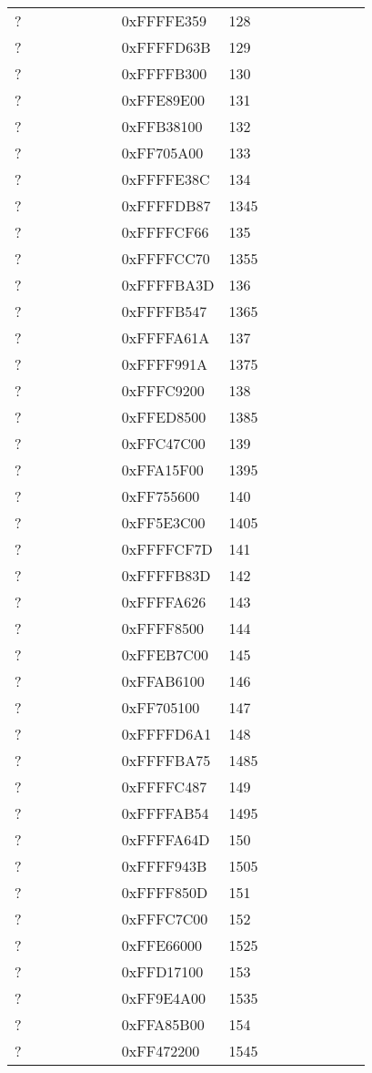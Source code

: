 \begin{longtable}{p{0.3\linewidth} p{0.3\linewidth} p{0.4\linewidth}}
? &  0xFFFFE359 &  128\\
? &  0xFFFFD63B &  129\\
? &  0xFFFFB300 &  130\\
? &  0xFFE89E00 &  131\\
? &  0xFFB38100 &  132\\
? &  0xFF705A00 &  133\\
? &  0xFFFFE38C &  134\\
? &  0xFFFFDB87 &  1345\\
? &  0xFFFFCF66 &  135\\
? &  0xFFFFCC70 &  1355\\
? &  0xFFFFBA3D &  136\\
? &  0xFFFFB547 &  1365\\
? &  0xFFFFA61A &  137\\
? &  0xFFFF991A &  1375\\
? &  0xFFFC9200 &  138\\
? &  0xFFED8500 &  1385\\
? &  0xFFC47C00 &  139\\
? &  0xFFA15F00 &  1395\\
? &  0xFF755600 &  140\\
? &  0xFF5E3C00 &  1405\\
? &  0xFFFFCF7D &  141\\
? &  0xFFFFB83D &  142\\
? &  0xFFFFA626 &  143\\
? &  0xFFFF8500 &  144\\
? &  0xFFEB7C00 &  145\\
? &  0xFFAB6100 &  146\\
? &  0xFF705100 &  147\\
? &  0xFFFFD6A1 &  148\\
? &  0xFFFFBA75 &  1485\\
? &  0xFFFFC487 &  149\\
? &  0xFFFFAB54 &  1495\\
? &  0xFFFFA64D &  150\\
? &  0xFFFF943B &  1505\\
? &  0xFFFF850D &  151\\
? &  0xFFFC7C00 &  152\\
? &  0xFFE66000 &  1525\\
? &  0xFFD17100 &  153\\
? &  0xFF9E4A00 &  1535\\
? &  0xFFA85B00 &  154\\
? &  0xFF472200 &  1545\\

\end{longtable}
